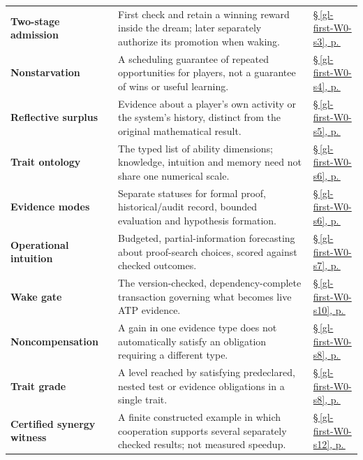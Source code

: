 \documentclass[11pt,letterpaper]{article}
\theoremstyle{definition}
\theoremstyle{plain}
\theoremstyle{definition}
\begin{document}
\begin{longtable}{@{}>{\raggedright\arraybackslash}p{.215\linewidth}>{\raggedright\arraybackslash}p{.585\linewidth}>{\raggedright\arraybackslash}p{.14\linewidth}@{}}
\textbf{Two-stage admission} & First check and retain a winning reward inside the dream; later separately authorize its promotion when waking. & \hyperref[gl-first-W0-s3]{\S\,\ref*{gl-first-W0-s3}, p.\,\pageref*{gl-first-W0-s3}} \\
\textbf{Nonstarvation} & A scheduling guarantee of repeated opportunities for players, not a guarantee of wins or useful learning. & \hyperref[gl-first-W0-s4]{\S\,\ref*{gl-first-W0-s4}, p.\,\pageref*{gl-first-W0-s4}} \\
\textbf{Reflective surplus} & Evidence about a player's own activity or the system's history, distinct from the original mathematical result. & \hyperref[gl-first-W0-s5]{\S\,\ref*{gl-first-W0-s5}, p.\,\pageref*{gl-first-W0-s5}} \\
\textbf{Trait ontology} & The typed list of ability dimensions; knowledge, intuition and memory need not share one numerical scale. & \hyperref[gl-first-W0-s6]{\S\,\ref*{gl-first-W0-s6}, p.\,\pageref*{gl-first-W0-s6}} \\
\textbf{Evidence modes} & Separate statuses for formal proof, historical/audit record, bounded evaluation and hypothesis formation. & \hyperref[gl-first-W0-s6]{\S\,\ref*{gl-first-W0-s6}, p.\,\pageref*{gl-first-W0-s6}} \\
\textbf{Operational intuition} & Budgeted, partial-information forecasting about proof-search choices, scored against checked outcomes. & \hyperref[gl-first-W0-s7]{\S\,\ref*{gl-first-W0-s7}, p.\,\pageref*{gl-first-W0-s7}} \\
\textbf{Wake gate} & The version-checked, dependency-complete transaction governing what becomes live ATP evidence. & \hyperref[gl-first-W0-s10]{\S\,\ref*{gl-first-W0-s10}, p.\,\pageref*{gl-first-W0-s10}} \\
\textbf{Noncompensation} & A gain in one evidence type does not automatically satisfy an obligation requiring a different type. & \hyperref[gl-first-W0-s8]{\S\,\ref*{gl-first-W0-s8}, p.\,\pageref*{gl-first-W0-s8}} \\
\textbf{Trait grade} & A level reached by satisfying predeclared, nested test or evidence obligations in a single trait. & \hyperref[gl-first-W0-s8]{\S\,\ref*{gl-first-W0-s8}, p.\,\pageref*{gl-first-W0-s8}} \\
\textbf{Certified synergy witness} & A finite constructed example in which cooperation supports several separately checked results; not measured speedup. & \hyperref[gl-first-W0-s12]{\S\,\ref*{gl-first-W0-s12}, p.\,\pageref*{gl-first-W0-s12}} \\
\end{longtable}\endgroup
\end{document}
